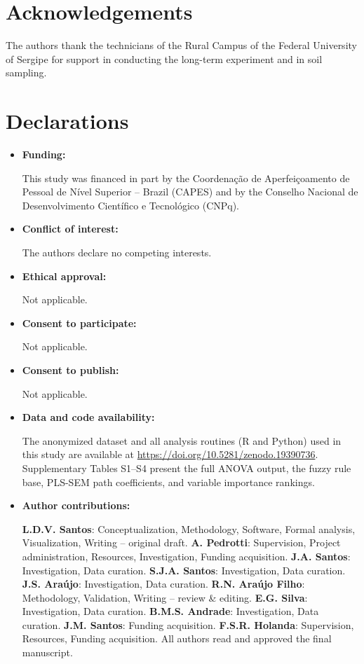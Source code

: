 \documentclass[pdflatex,sn-basic]{sn-jnl}%
\begin{document}
\backmatter


\section*{Acknowledgements}

The authors thank the technicians of the Rural Campus of the Federal University of Sergipe for support in conducting the long-term experiment and in soil sampling.

\section*{Declarations}

\begin{itemize}
\item \textbf{Funding:}

This study was financed in part by the Coordena\c{c}\~{a}o de Aperfei\c{c}oamento de Pessoal de N\'{i}vel Superior -- Brazil (CAPES) and by the Conselho Nacional de Desenvolvimento Cient\'{i}fico e Tecnol\'{o}gico (CNPq).

\item \textbf{Conflict of interest:}

The authors declare no competing interests.

\item \textbf{Ethical approval:}

Not applicable.
\item \textbf{Consent to participate:}

Not applicable.
\item \textbf{Consent to publish:}

Not applicable.
\item \textbf{Data and code availability:}


The anonymized dataset and all analysis routines (R and Python) used in this study are available at \url{https://doi.org/10.5281/zenodo.19390736}. Supplementary Tables S1--S4 present the full ANOVA output, the fuzzy rule base, PLS-SEM path coefficients, and variable importance rankings.

\item \textbf{Author contributions:}

\textbf{L.D.V. Santos}: Conceptualization, Methodology, Software, Formal analysis, Visualization, Writing -- original draft. \textbf{A. Pedrotti}: Supervision, Project administration, Resources, Investigation, Funding acquisition. \textbf{J.A. Santos}: Investigation, Data curation. \textbf{S.J.A. Santos}: Investigation, Data curation. \textbf{J.S. Ara\'{u}jo}: Investigation, Data curation. \textbf{R.N. Ara\'{u}jo Filho}: Methodology, Validation, Writing -- review \& editing. \textbf{E.G. Silva}: Investigation, Data curation. \textbf{B.M.S. Andrade}: Investigation, Data curation. \textbf{J.M. Santos}: Funding acquisition. \textbf{F.S.R. Holanda}: Supervision, Resources, Funding acquisition. All authors read and approved the final manuscript.
\end{itemize}

\end{document}
